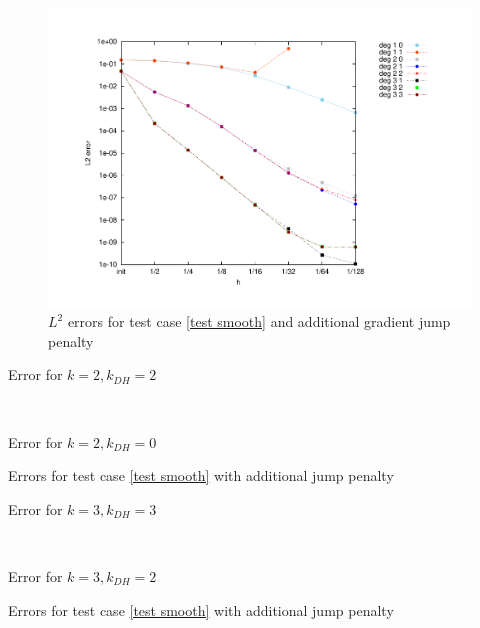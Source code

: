 \begin{figure}[h!]
\centering
	\includegraphics[scale=0.45]{plots/MA1_Neilan_GradJump_l2.pdf}
	\caption{$L^2$ errors for test case \ref{test smooth} and additional gradient jump penalty}
	\label{fig: l2 errors test 1 jump}
\end{figure}
\begin{table}[H]
	\begin{subtable}[b]{0.4\textwidth}
		\centering
		\pgfplotstabletypeset[
		columns={iterations, l2error, h1error,N},
		every row 0 column 0/.style={set content=init},
		]\MAOneJumpdegTwoTwo
		\caption{Error for $k=2, k_{DH}=2$}
	\end{subtable}
	~
	\begin{subtable}[b]{0.4\textwidth}
		\centering
		\pgfplotstabletypeset[columns={iterations, l2error, h1error,N},
		every row 0 column 0/.style={set content=init},
		]\MAOneJumpdegTwoZero
		\caption{Error for $k=2, k_{DH}=0$}
	\end{subtable}
	\caption{Errors for test case \ref{test smooth} with additional jump penalty}
	\label{tab: l2 errors test 1 deg 2 jump}
\end{table}
\begin{table}[h]
	\begin{subtable}[b]{0.45\textwidth}
		\centering
		\pgfplotstabletypeset[
		columns={iterations, l2error, h1error,N},
		every row 0 column 0/.style={set content=init},
		]\MAOneJumpdegThreeThree
		\caption{Error for $k=3, k_{DH}=3$}
	\end{subtable}
	~
	\begin{subtable}[b]{0.45\textwidth}
		\centering
		\pgfplotstabletypeset[columns={iterations, l2error, h1error,N},
		every row 0 column 0/.style={set content=init},
		]\MAOneJumpdegThreeTwo
		\caption{Error for $k=3, k_{DH}=2$}
	\end{subtable}
	\caption{Errors for test case \ref{test smooth} with additional jump penalty}
	\label{tab: l2 errors test 1 deg 3 jump}
\end{table}

